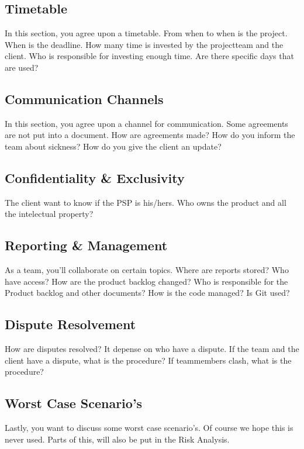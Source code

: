 \documentclass[10pt]{report}
\begin{document}
\subsection{Timetable}

In this section, you agree upon a timetable. From when to when is the project. When is the deadline. How many time is invested by the projectteam and the client. Who is responsible for investing enough time. Are there specific days that are used?

\subsection{Communication Channels}

In this section, you agree upon a channel for communication. Some agreements are not put into a document. How are agreements made? How do you inform the team about sickness? How do you give the client an update?

\subsection{Confidentiality \& Exclusivity}

The client want to know if the PSP is his/hers. Who owns the product and all the intelectual property? 

\subsection{Reporting \& Management}

As a team, you'll collaborate on certain topics. Where are reports stored? Who have access? How are the product backlog changed? Who is responsible for the Product backlog and other documents? How is the code managed? Is Git used?

\subsection{Dispute Resolvement}

How are disputes resolved? It depense on who have a dispute. If the team and the client have a dispute, what is the procedure? If teammembers clash, what is the procedure?

\subsection{Worst Case Scenario's}

Lastly, you want to discuss some worst case scenario's. Of course we hope this is never used. Parts of this, will also be put in the Risk Analysis.
\end{document}

